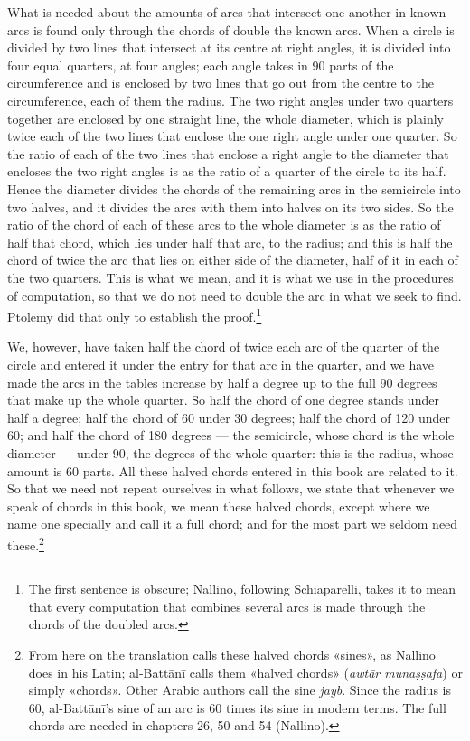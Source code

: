 \documentclass[11pt]{article}
\newcommand{\ArPage}[1]{\marginpar{\footnotesize\color{gray}Ar.\,p.\,#1}}
\begin{document}
\par \ArPage{15}What is needed about the amounts of arcs that intersect one another in known arcs is found only through the chords of double the known arcs. When a circle is divided by two lines that intersect at its centre at right angles, it is divided into four equal quarters, at four angles; each angle takes in 90 parts of the circumference and is enclosed by two lines that go out from the centre to the circumference, each of them the radius. The two right angles under two quarters together are enclosed by one straight line, the whole diameter, which is plainly twice each of the two lines that enclose the one right angle under one quarter. So the ratio of each of the two lines that enclose a right angle to the diameter that encloses the two right angles is as the ratio of a quarter of the circle to its half. Hence the diameter divides the chords of the remaining arcs in the semicircle into two halves, and it divides the arcs with them into halves on its two sides. So the ratio of the chord of each of these arcs to the whole diameter is as the ratio of half that chord, which lies under half that arc, to the radius; and this is half the chord of twice the arc that lies on either side of the diameter, half of it in each of the two quarters. This is what we mean, and it is what we use in the procedures of computation, so that we do not need to double the arc in what we seek to find. Ptolemy did that only to establish the proof.\footnote{The first sentence is obscure; Nallino, following Schiaparelli, takes it to mean that every computation that combines several arcs is made through the chords of the doubled arcs.}\par
\par We, however, have taken half the chord of twice each arc of the quarter of the circle and entered it under the entry for that arc in the quarter, and we have made the arcs in the tables increase by half a degree up to the full 90 degrees that make up the whole quarter. So half the chord of one degree stands under half a degree; half the chord of 60 under 30 degrees; half the chord of 120 under 60; and half the chord of 180 degrees — the semicircle, whose chord is the whole diameter — under 90, the degrees of the whole quarter: this is the radius, whose amount is 60 parts. All these halved chords entered in this book are related to it. So that we need not repeat ourselves in what follows, we state that whenever we speak of chords in this book, we mean these halved chords, except where we name one specially and call it a full chord; and for the most part we seldom need these.\footnote{From here on the translation calls these halved chords «sines», as Nallino does in his Latin; al-Battānī calls them «halved chords» (\emph{awtār munaṣṣafa}) or simply «chords». Other Arabic authors call the sine \emph{jayb}. Since the radius is 60, al-Battānī's sine of an arc is 60 times its sine in modern terms. The full chords are needed in chapters 26, 50 and 54 (Nallino).}\par
\end{document}
